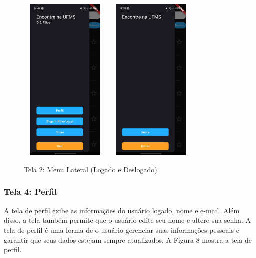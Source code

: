     \begin{figure}[h]
        \centering
        \includegraphics[width=44mm,height=80mm]{imagens/menu-lateral-logado.jpg}
        \hspace{10mm}
        \includegraphics[width=44mm,height=80mm]{imagens/menu-lateral-logout.jpg}
        \caption{\scriptsize Tela 2: Menu Lateral (Logado e Deslogado)}
        \label{fig:tela2-logado}
    \end{figure}

    \FloatBarrier

\subsubsection{Tela 4: Perfil}

    A tela de perfil exibe as informações do usuário logado, nome e e-mail. Além disso, a tela também permite que o usuário edite seu nome e altere sua senha. A tela de perfil é uma forma de o usuário gerenciar suas informações pessoais e garantir que seus dados estejam sempre atualizados. A Figura 8 mostra a tela de perfil.

